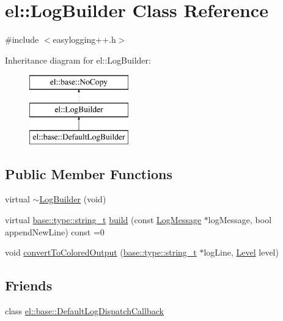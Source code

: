 \hypertarget{classel_1_1_log_builder}{}\section{el\+:\+:Log\+Builder Class Reference}
\label{classel_1_1_log_builder}


{\ttfamily \#include $<$easylogging++.\+h$>$}

Inheritance diagram for el\+:\+:Log\+Builder\+:\begin{figure}[H]
\begin{center}
\leavevmode
\includegraphics[height=3.000000cm]{classel_1_1_log_builder}
\end{center}
\end{figure}
\subsection*{Public Member Functions}
\begin{DoxyCompactItemize}
\item 
virtual \hyperlink{classel_1_1_log_builder_ae45008e1c004367ef611b22662e7ed72}{$\sim$\+Log\+Builder} (void)
\item 
virtual \hyperlink{namespaceel_1_1base_1_1type_a67e406cd213c231f1d135b5a4eda64b5}{base\+::type\+::string\+\_\+t} \hyperlink{classel_1_1_log_builder_a633b373a3bb9d3e17bdd664aeba4dbc8}{build} (const \hyperlink{classel_1_1_log_message}{Log\+Message} $\ast$log\+Message, bool append\+New\+Line) const =0
\item 
void \hyperlink{classel_1_1_log_builder_a229244f323f25bdbd7725f8bbf983a17}{convert\+To\+Colored\+Output} (\hyperlink{namespaceel_1_1base_1_1type_a67e406cd213c231f1d135b5a4eda64b5}{base\+::type\+::string\+\_\+t} $\ast$log\+Line, \hyperlink{namespaceel_ab0ac6091262344c52dd2d3ad099e8e36}{Level} level)
\end{DoxyCompactItemize}
\subsection*{Friends}
\begin{DoxyCompactItemize}
\item 
class \hyperlink{classel_1_1_log_builder_a42b1de96d584ae4fecbfc2b9aff95052}{el\+::base\+::\+Default\+Log\+Dispatch\+Callback}
\end{DoxyCompactItemize}


